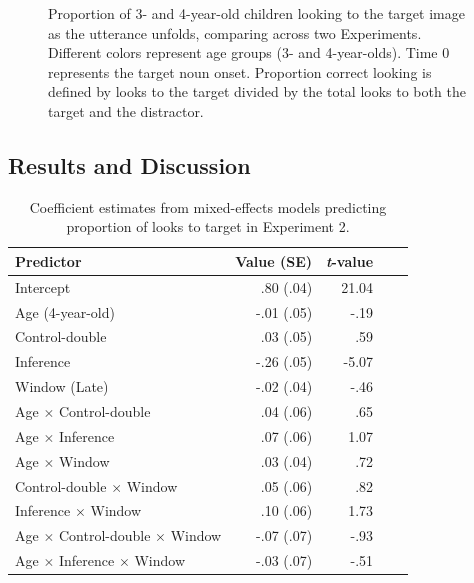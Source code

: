 \documentclass[10pt,letterpaper]{article}
\begin{document}
\begin{figure}[t]
	\caption{\label{fig:pros0} Proportion of 3- and 4-year-old children looking to the target image as the utterance unfolds, comparing across two Experiments. Different colors represent age groups (3- and 4-year-olds). Time 0 represents the target noun onset. Proportion correct looking is defined by looks to the target divided by the total looks to both the target and the distractor.}
\end{figure}


\subsection{Results and Discussion}

\begin{table}[b!]
\caption{\label{tab:lmer3}  Coefficient estimates from mixed-effects models predicting proportion of looks to target in Experiment 2.} 
\begin{center} 
\begin{tabular}{l r r r l} 
\hline
Predictor  &  Value (SE) & \emph{t}-value\\
\hline
Intercept  & .80 (.04) & 21.04 \\
Age (4-year-old) & -.01 (.05) &  -.19 \\
Control-double & .03 (.05) & .59 \\
Inference & -.26 (.05) & -5.07 \\
Window (Late) & -.02 (.04) & -.46 \\
Age $\times$  Control-double & .04 (.06) & .65 \\
Age $\times$  Inference & .07 (.06) & 1.07 \\
Age $\times$  Window & .03 (.04) & .72 \\
Control-double $\times$  Window & .05 (.06) & .82 \\
Inference $\times$ Window & .10 (.06) & 1.73 \\
Age $\times$ Control-double $\times$ Window & -.07 (.07) & -.93 \\
Age $\times$ Inference $\times$ Window & -.03 (.07) & -.51 \\
\hline
\end{tabular} 
\end{center} 
\end{table}
\end{document}
